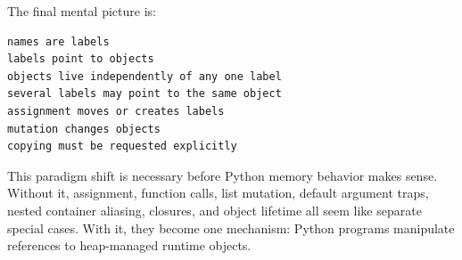 The final mental picture is:

\begin{verbatim}
names are labels
labels point to objects
objects live independently of any one label
several labels may point to the same object
assignment moves or creates labels
mutation changes objects
copying must be requested explicitly
\end{verbatim}

This paradigm shift is necessary before Python memory behavior makes sense. Without it, assignment, function calls, list mutation, default argument traps, nested container aliasing, closures, and object lifetime all seem like separate special cases. With it, they become one mechanism: Python programs manipulate references to heap-managed runtime objects.
